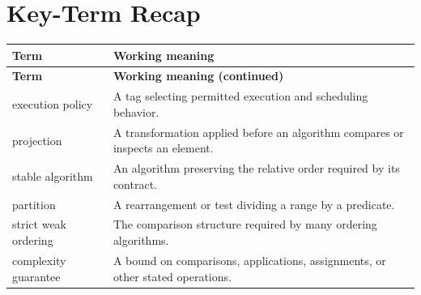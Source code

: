 \documentclass[11pt,letterpaper]{article}
\begin{document}
\section{Key-Term Recap}
\begin{longtable}{@{}>{\RaggedRight\arraybackslash}p{}>{\RaggedRight\arraybackslash}p{}@{}}\toprule\textbf{Term} & \textbf{Working meaning}\\\midrule\endfirsthead\toprule\textbf{Term} & \textbf{Working meaning (continued)}\\\midrule\endhead\bottomrule\endfoot
execution policy & A tag selecting permitted execution and scheduling behavior.\\
projection & A transformation applied before an algorithm compares or inspects an element.\\
stable algorithm & An algorithm preserving the relative order required by its contract.\\
partition & A rearrangement or test dividing a range by a predicate.\\
strict weak ordering & The comparison structure required by many ordering algorithms.\\
complexity guarantee & A bound on comparisons, applications, assignments, or other stated operations.\\
\end{longtable}
\end{document}
